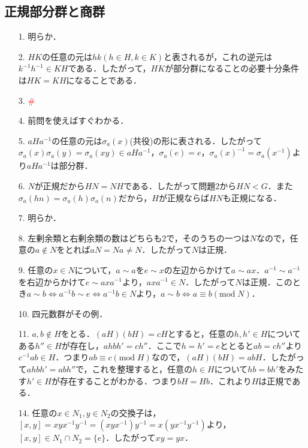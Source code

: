 \documentclass[a4paper,10pt,uplatex]{jsarticle}
\newcommand{\Set}[1]{\{#1\}}
\newcommand{\miss}{\textcolor{red}{\#}}
\newcommand{\Mod}{\text{mod}\;}
\numberwithin{equation}{section}
\theoremstyle{mystyle}
\begin{document}
\subsection{正規部分群と商群}
\begin{itemize}
    \item[1.] 明らか．
    \item[2.] $HK$の任意の元は$hk(h \in H, k \in K)$と表されるが，これの逆元は$k^{-1}h^{-1} \in KH$である．したがって，$HK$が部分群になることの必要十分条件は$HK = KH$になることである．
    \item[3.] \miss
    \item[4.] 前問を使えばすぐわかる．
    \item[5.] $aHa^{-1}$の任意の元は$\sigma_a(x)$(共役)の形に表される．したがって$\sigma_a(x)\sigma_a(y)=\sigma_a(xy) \in aHa^{-1}$，$\sigma_a(e) = e$，$\sigma_a(x)^{-1} = \sigma_a(x^{-1})$より$aHa^{-1}$は部分群．
    \item[6.] $N$が正規だから$HN = NH$である．したがって問題2から$HN < G$．また$\sigma_a(hn) = \sigma_a(h)\sigma_a(n)$だから，$H$が正規ならば$HN$も正規になる．
    \item[7.] 明らか．
    \item[8.] 左剰余類と右剰余類の数はどちらも2で，そのうちの一つは$N$なので，任意の$a \notin N$をとれば$aN = Na \neq N$．したがって$N$は正規．
    \item[9.] 任意の$x \in N$について，$a \sim a$を$e \sim x$の左辺からかけて$a \sim ax$．$a^{-1} \sim a^{-1}$を右辺からかけて$e \sim axa^{-1}$より，$axa^{-1} \in N$．したがって$N$は正規．このとき$a \sim b \Leftrightarrow a^{-1}b \sim e \Leftrightarrow a^{-1}b \in N$より，$a \sim b \Leftrightarrow a \equiv b (\Mod N)$．
    \item[10.] 四元数群がその例．
    \item[11.] $a,b \notin H$をとる．$(aH)(bH) = cH$とすると，任意の$h,h' \in H$についてある$h'' \in H$が存在し，$ahbh' = ch''$．ここで$h = h' = e$ととると$ab = ch''$より$c^{-1}ab \in H$．つまり$ab \equiv c(\Mod H)$なので，$(aH)(bH) = abH$．したがって$ahbh' = abh''$で，これを整理すると，任意の$h \in H$について$hb = bh'$をみたす$h' \in H$が存在することがわかる．つまり$bH = Hb$．これより$H$は正規である．
    \item[14.] 任意の$x \in N_1, y \in N_2$の交換子は，$[x,y] = xyx^{-1}y^{-1} = (xyx^{-1})y^{-1} = x(yx^{-1}y^{-1})$より，$[x,y] \in N_1 \cap N_2 = \Set{e}$．したがって$xy = yx$．
\end{itemize}
\end{document}
